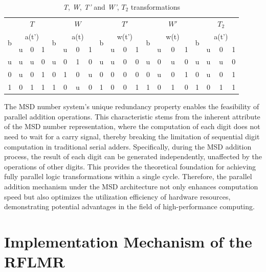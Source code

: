 \documentclass[electronics,article,accept,pdftex,moreauthors]{Definitions/mdpi}
\begin{document}
\begin{table}[H]
\caption{\textit{T}, \textit{W}, \textit{T'} and \textit{W'}, $T_2$ transformations}
\label{tab1}
\centering
\begin{tabular}{*{20}{c}}
  \toprule
  &&$T$& & &&$W$& & & &$T'$ &  &&&$W'$ & & & & $T_2$ \\
\cmidrule(l{5pt}){1-20}
  \multirow{2}{*}{b} & \multicolumn{3}{c}{a(t')} &\multirow{2}{*}{b}& \multicolumn{3}{c}{a(t)}  &\multirow{2}{*}{b}& \multicolumn{3}{c}{w(t')} &\multirow{2}{*}{b}& \multicolumn{3}{c}{w(t)}&\multirow{2}{*}{b}& \multicolumn{3}{c}{a(t')} \\
  \cmidrule(lr){2-4}\cmidrule(lr){6-8}\cmidrule(lr){10-12}\cmidrule(lr){14-16}\cmidrule(lr){18-20}
  & u & 0 & 1 & & u & 0 & 1 & & u & 0 & 1 & & u & 0 & 1 & & u & 0 & 1 \\
  \midrule
   u& u & u & 0 & u & 0 & 1 & 0 & u & u & 0 & 0 & u & 0 & u & 0 & u & u & u & 0\\
   0& u & 0 & 1 & 0 & 1 & 0 & u & 0 & 0 & 0 & 0 & 0 & u & 0 & 1 & 0 & u & 0 & 1\\
   1& 0 & 1 & 1 & 1 & 0 & u & 0 & 1 & 0 & 0 & 1 & 1 & 0 & 1 & 0 & 1 & 0 & 1 & 1\\
  \bottomrule
\end{tabular}

\end{table}
The MSD number system's unique redundancy property enables the feasibility of parallel addition operations. This characteristic stems from the inherent attribute of the MSD number representation, where the computation of each digit does not need to wait for a carry signal, thereby breaking the limitation of sequential digit computation in traditional serial adders. Specifically, during the MSD addition process, the result of each digit can be generated independently, unaffected by the operations of other digits. This provides the theoretical foundation for achieving fully parallel logic transformations within a single cycle. Therefore, the parallel addition mechanism under the MSD architecture not only enhances computation speed but also optimizes the utilization efficiency of hardware resources, demonstrating potential advantages in the field of high-performance computing.
\section{Implementation Mechanism of the RFLMR }
\end{document}
